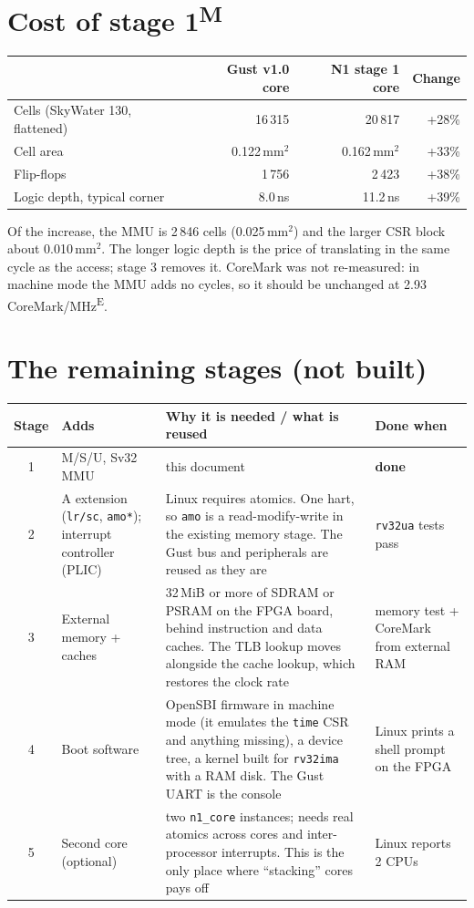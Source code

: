 \documentclass[10pt,a4paper]{article}
\newcommand{\code}[1]{\texttt{#1}}
\newcommand{\meas}{\textsuperscript{M}}
\newcommand{\est}{\textsuperscript{E}}
\begin{document}
\section{Cost of stage 1\meas}
\begin{center}\small\begin{tabular}{@{}lrrr@{}}\toprule
 & Gust v1.0 core & N1 stage 1 core & Change \\\midrule
Cells (SkyWater 130, flattened) & 16\,315 & 20\,817 & +28\% \\
Cell area & 0.122\,mm$^2$ & 0.162\,mm$^2$ & +33\% \\
Flip-flops & 1\,756 & 2\,423 & +38\% \\
Logic depth, typical corner & 8.0\,ns & 11.2\,ns & +39\% \\\bottomrule
\end{tabular}\end{center}
Of the increase, the MMU is 2\,846 cells (0.025\,mm$^2$) and the larger CSR block about 0.010\,mm$^2$. The longer logic depth is the price of translating in the same cycle as the access; stage 3 removes it. CoreMark was not re-measured: in machine mode the MMU adds no cycles, so it should be unchanged at 2.93 CoreMark/MHz\est.

\section{The remaining stages (not built)}
\begin{center}\small\begin{tabularx}{\linewidth}{@{}cp{27mm}Xp{27mm}@{}}\toprule
Stage & Adds & Why it is needed / what is reused & Done when \\\midrule
1 & M/S/U, Sv32 MMU & this document & \textbf{done} \\
2 & A extension (\code{lr/sc}, \code{amo*}); interrupt controller (PLIC) & Linux requires atomics. One hart, so \code{amo} is a read-modify-write in the existing memory stage. The Gust bus and peripherals are reused as they are & \code{rv32ua} tests pass \\
3 & External memory + caches & 32\,MiB or more of SDRAM or PSRAM on the FPGA board, behind instruction and data caches. The TLB lookup moves alongside the cache lookup, which restores the clock rate & memory test + CoreMark from external RAM \\
4 & Boot software & OpenSBI firmware in machine mode (it emulates the \code{time} CSR and anything missing), a device tree, a kernel built for \code{rv32ima} with a RAM disk. The Gust UART is the console & Linux prints a shell prompt on the FPGA \\
5 & Second core (optional) & two \code{n1\_core} instances; needs real atomics across cores and inter-processor interrupts. This is the only place where ``stacking'' cores pays off & Linux reports 2 CPUs \\\bottomrule
\end{tabularx}\end{center}
\end{document}

